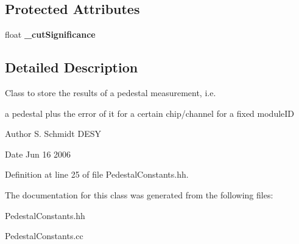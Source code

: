 \subsection*{Protected Attributes}
\begin{DoxyCompactItemize}
\item 
float {\bfseries \-\_\-cut\-Significance}\label{classCALICE_1_1PedestalConstants_a6ceabef97402ca961f73c04a543837ed}

\end{DoxyCompactItemize}


\subsection{Detailed Description}
Class to store the results of a pedestal measurement, i.\-e. 

a pedestal plus the error of it for a certain chip/channel for a fixed module\-I\-D \begin{DoxyAuthor}{Author}
S. Schmidt D\-E\-S\-Y 
\end{DoxyAuthor}
\begin{DoxyDate}{Date}
Jun 16 2006 
\end{DoxyDate}


Definition at line 25 of file Pedestal\-Constants.\-hh.



The documentation for this class was generated from the following files\-:\begin{DoxyCompactItemize}
\item 
Pedestal\-Constants.\-hh\item 
Pedestal\-Constants.\-cc\end{DoxyCompactItemize}
